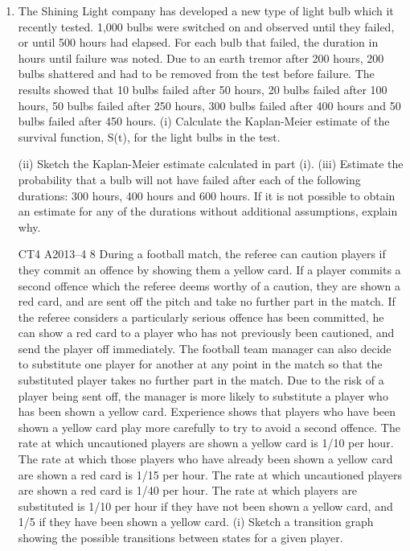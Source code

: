 \documentclass[a4paper,12pt]{article}
\begin{document}
\begin{enumerate}
\item 

The Shining Light company has developed a new type of light bulb which it recently
tested. 1,000 bulbs were switched on and observed until they failed, or until 500
hours had elapsed. For each bulb that failed, the duration in hours until failure was
noted. Due to an earth tremor after 200 hours, 200 bulbs shattered and had to be
removed from the test before failure.
The results showed that 10 bulbs failed after 50 hours, 20 bulbs failed after 100 hours,
50 bulbs failed after 250 hours, 300 bulbs failed after 400 hours and 50 bulbs failed
after 450 hours.
(i) Calculate the Kaplan-Meier estimate of the survival function, S(t), for the light
bulbs in the test.

(ii) Sketch the Kaplan-Meier estimate calculated in part (i).
(iii) Estimate the probability that a bulb will not have failed after each of the
following durations: 300 hours, 400 hours and 600 hours. If it is not possible
to obtain an estimate for any of the durations without additional assumptions,
explain why.

CT4 A2013–4
8
During a football match, the referee can caution players if they commit an offence by
showing them a yellow card. If a player commits a second offence which the referee
deems worthy of a caution, they are shown a red card, and are sent off the pitch and
take no further part in the match. If the referee considers a particularly serious
offence has been committed, he can show a red card to a player who has not
previously been cautioned, and send the player off immediately.
The football team manager can also decide to substitute one player for another at any
point in the match so that the substituted player takes no further part in the match.
Due to the risk of a player being sent off, the manager is more likely to substitute a
player who has been shown a yellow card. Experience shows that players who have
been shown a yellow card play more carefully to try to avoid a second offence.
The rate at which uncautioned players are shown a yellow card is 1/10 per hour.
The rate at which those players who have already been shown a yellow card are
shown a red card is 1/15 per hour.
The rate at which uncautioned players are shown a red card is 1/40 per hour.
The rate at which players are substituted is 1/10 per hour if they have not been shown
a yellow card, and 1/5 if they have been shown a yellow card.
(i) Sketch a transition graph showing the possible transitions between states for a
given player.


\end{enumerate}
\end{document}
